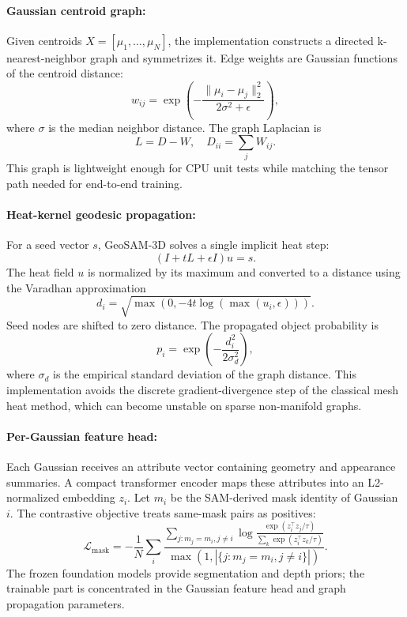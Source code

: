 \documentclass{article}
\begin{document}
\paragraph{Gaussian centroid graph:}

Given centroids $X=[\mu_1,\ldots,\mu_N]$, the implementation constructs a directed k-nearest-neighbor graph and symmetrizes it. Edge weights are Gaussian functions of the centroid distance:
\begin{equation}
  w_{ij} = \exp\left(-\frac{\|\mu_i-\mu_j\|_2^2}{2\sigma^2+\epsilon}\right),
\end{equation}
where $\sigma$ is the median neighbor distance. The graph Laplacian is
\begin{equation}
  L = D - W, \quad D_{ii}=\sum_j W_{ij}.
\end{equation}
This graph is lightweight enough for CPU unit tests while matching the tensor path needed for end-to-end training.

\paragraph{Heat-kernel geodesic propagation:}

For a seed vector $s$, GeoSAM-3D solves a single implicit heat step:
\begin{equation}
  (I + tL + \epsilon I)u = s.
\end{equation}
The heat field $u$ is normalized by its maximum and converted to a distance using the Varadhan approximation
\begin{equation}
  d_i = \sqrt{\max(0,-4t\log(\max(u_i,\epsilon)))}.
\end{equation}
Seed nodes are shifted to zero distance. The propagated object probability is
\begin{equation}
  p_i = \exp\left(-\frac{d_i^2}{2\sigma_d^2}\right),
\end{equation}
where $\sigma_d$ is the empirical standard deviation of the graph distance. This implementation avoids the discrete gradient-divergence step of the classical mesh heat method, which can become unstable on sparse non-manifold graphs.

\paragraph{Per-Gaussian feature head:}

Each Gaussian receives an attribute vector containing geometry and appearance summaries. A compact transformer encoder maps these attributes into an L2-normalized embedding $z_i$. Let $m_i$ be the SAM-derived mask identity of Gaussian $i$. The contrastive objective treats same-mask pairs as positives:
\begin{equation}
  \mathcal{L}_{\text{mask}} = -\frac{1}{N}\sum_i
  \frac{\sum_{j:m_j=m_i, j\neq i}\log \frac{\exp(z_i^\top z_j/\tau)}{\sum_k \exp(z_i^\top z_k/\tau)}}{\max(1,|\{j:m_j=m_i,j\neq i\}|)}.
\end{equation}
The frozen foundation models provide segmentation and depth priors; the trainable part is concentrated in the Gaussian feature head and graph propagation parameters.
\end{document}
